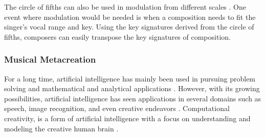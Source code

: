         
        
		
        The circle of fifths can also be used in modulation from different scales \citep{clough1986musical,jensen1992circle}. One event where modulation would be needed is when a composition needs to fit the singer's vocal range and key. Using the key signatures derived from the circle of fifths, composers can easily transpose the key signatures of composition. %
        
        
        
        \subsubsection{Musical Metacreation}
            
            For a long time, artificial intelligence has mainly been used in pursuing problem solving and mathematical and analytical applications \citep{steels1993artificial}. However, with its growing possibilities, artificial intelligence has seen applications in several domains such as speech, image recognition, and even creative endeavors \citep{russell1995modern}. Computational creativity, is a form of artificial intelligence with a focus on understanding and modeling the creative human brain \citep{pasquier2017an}. 
            
